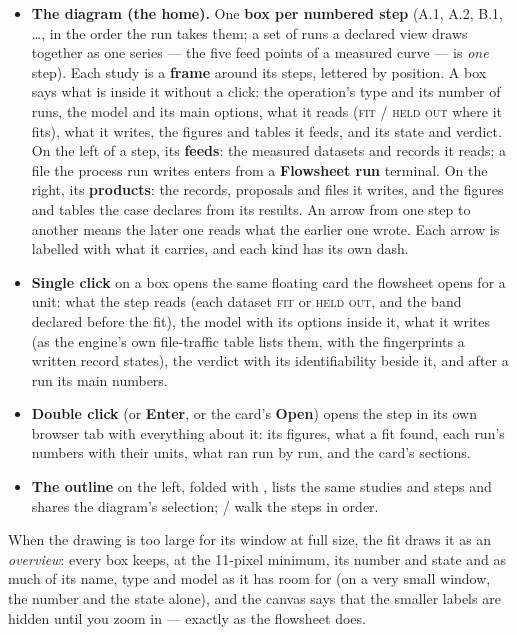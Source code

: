 \documentclass[11pt,a4paper]{article}
\begin{document}
\begin{itemize}[leftmargin=*,nosep,topsep=2pt]
  \item \textbf{The diagram (the home).}  One \textbf{box per numbered
        step} (A.1, A.2, B.1, \dots, in the order the run takes them; a
        set of runs a declared view draws together as one series --- the
        five feed points of a measured curve --- is \emph{one} step).
        Each study is a \textbf{frame} around its steps, lettered by
        position.  A box says what is inside it without a click: the
        operation's type and its number of runs, the model and its main
        options, what it reads (\textsc{fit} / \textsc{held out} where it
        fits), what it writes, the figures and tables it feeds, and its
        state and verdict.  On the left of a step, its \textbf{feeds}: the
        measured datasets and records it reads; a file the process run
        writes enters from a \textbf{Flowsheet run} terminal.  On the
        right, its \textbf{products}: the records, proposals and files it
        writes, and the figures and tables the case declares from its
        results.  An arrow from one step to another means the later one
        reads what the earlier one wrote.  Each arrow is labelled with
        what it carries, and each kind has its own dash.
  \item \textbf{Single click} on a box opens the same floating card the
        flowsheet opens for a unit: what the step reads (each dataset
        \textsc{fit} or \textsc{held out}, and the band declared before
        the fit), the model with its options inside it, what it writes
        (as the engine's own file-traffic table lists them, with the
        fingerprints a written record states), the verdict with its
        identifiability beside it, and after a run its main numbers.
  \item \textbf{Double click} (or \textbf{Enter}, or the card's
        \textbf{Open}) opens the step in its own browser tab with
        everything about it: its figures, what a fit found, each run's
        numbers with their units, what ran run by run, and the card's
        sections.
  \item \textbf{The outline} on the left, folded with \code{[}, lists
        the same studies and steps and shares the diagram's selection;
        \code{$\uparrow$}/\code{$\downarrow$} walk the steps in order.
\end{itemize}

When the drawing is too large for its window at full size, the fit draws
it as an \emph{overview}: every box keeps, at the 11-pixel minimum, its
number and state and as much of its name, type and model as it has room
for (on a very small window, the number and the state alone), and the
canvas says that the smaller
labels are hidden until you zoom in --- exactly as the flowsheet does.
\end{document}
